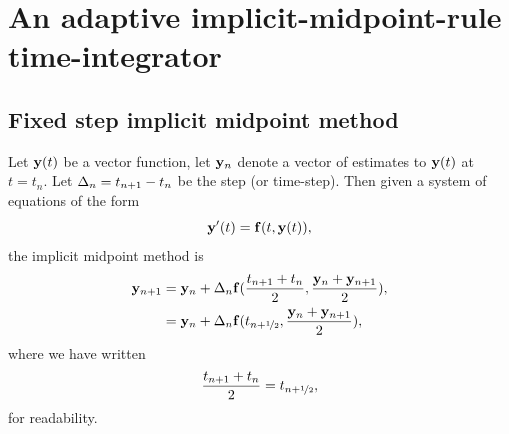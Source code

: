 


\newcommand{\thfx}[1]{t_{#1+\half}}
\newcommand{\thf}{\thfx{n}}

\newcommand{\yvhfx}[2]{\yv#1(\thfx{#2})}
\newcommand{\yvhf}[1][]{\yvhfx{#1}{n}}

\newcommand{\dfdy}{F}
\newcommand{\dfdyhfx}[1]{\dfdy_{#1+\half}}
\newcommand{\dfdyhf}{\dfdyhfx{n}}

\newcommand{\ymiderr}{a_n}



\section{An adaptive implicit-midpoint-rule time-integrator}





\subsection{Fixed step implicit midpoint method}

Let $\mathbf{y}(t)$ be a vector function, let $\mathbf{y}_n$ denote a vector of estimates to $\mathbf{y}(t)$ at $t = t_n$.
Let $\Delta_{n} = t_{n+1} - t_n$ be the step (or time-step).
Then given a system of equations of the form
\begin{equation}
  \mathbf{y}'(t) = {\mathbf{f}}(t, \mathbf{y}(t)),
  \label{eq:43}
\end{equation}
the implicit midpoint method is
\begin{align}
  \yv_{n+1} &= \yv_n + \dtn \fv(\frac{t_{n+1} + t_n}{2}, \frac{\yv_n + \yv_{n+1}}{2}), \notag\\
  &= \yv_n + \dtn \fv(\thf, \frac{\yv_n + \yv_{n+1}}{2}),
  \label{eq:basic-midpoint}
\end{align}
where we have written
\begin{equation}
  \frac{t_{n+1} + t_n}{2} = \thf,
\end{equation}
for readability.

